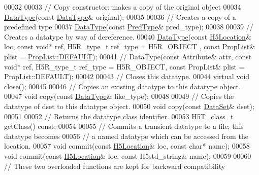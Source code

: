 \begin{DoxyCode}
00032 
00033         \textcolor{comment}{// Copy constructor: makes a copy of the original object}
00034         \hyperlink{class_h5_1_1_data_type}{DataType}(\textcolor{keyword}{const} \hyperlink{class_h5_1_1_data_type}{DataType}& original);
00035 
00036         \textcolor{comment}{// Creates a copy of a predefined type}
00037         \hyperlink{class_h5_1_1_data_type}{DataType}(\textcolor{keyword}{const} \hyperlink{class_h5_1_1_pred_type}{PredType}& pred\_type);
00038 
00039         \textcolor{comment}{// Creates a datatype by way of dereference.}
00040         \hyperlink{class_h5_1_1_data_type}{DataType}(\textcolor{keyword}{const} \hyperlink{class_h5_1_1_h5_location}{H5Location}& loc, \textcolor{keyword}{const} \textcolor{keywordtype}{void}* ref, H5R\_type\_t ref\_type = H5R\_OBJECT
      , \textcolor{keyword}{const} \hyperlink{class_h5_1_1_prop_list}{PropList}& plist = \hyperlink{class_h5_1_1_prop_list_ae52af66ce82af0ea7e6dc57148c56241}{PropList::DEFAULT});
00041 \textcolor{comment}{//        DataType(const Attribute& attr, const void* ref, H5R\_type\_t ref\_type = H5R\_OBJECT, const
       PropList& plist = PropList::DEFAULT);}
00042 
00043         \textcolor{comment}{// Closes this datatype.}
00044         \textcolor{keyword}{virtual} \textcolor{keywordtype}{void} close();
00045 
00046         \textcolor{comment}{// Copies an existing datatype to this datatype object.}
00047         \textcolor{keywordtype}{void} copy(\textcolor{keyword}{const} \hyperlink{class_h5_1_1_data_type}{DataType}& like\_type);
00048 
00049         \textcolor{comment}{// Copies the datatype of dset to this datatype object.}
00050         \textcolor{keywordtype}{void} copy(\textcolor{keyword}{const} \hyperlink{class_h5_1_1_data_set}{DataSet}& dset);
00051 
00052         \textcolor{comment}{// Returns the datatype class identifier.}
00053         H5T\_class\_t getClass() \textcolor{keyword}{const};
00054 
00055         \textcolor{comment}{// Commits a transient datatype to a file; this datatype becomes}
00056         \textcolor{comment}{// a named datatype which can be accessed from the location.}
00057         \textcolor{keywordtype}{void} commit(\textcolor{keyword}{const} \hyperlink{class_h5_1_1_h5_location}{H5Location}& loc, \textcolor{keyword}{const} \textcolor{keywordtype}{char}* name);
00058         \textcolor{keywordtype}{void} commit(\textcolor{keyword}{const} \hyperlink{class_h5_1_1_h5_location}{H5Location}& loc, \textcolor{keyword}{const} H5std\_string& name);
00059 
00060         \textcolor{comment}{// These two overloaded functions are kept for backward compatibility}

\end{DoxyCode}
